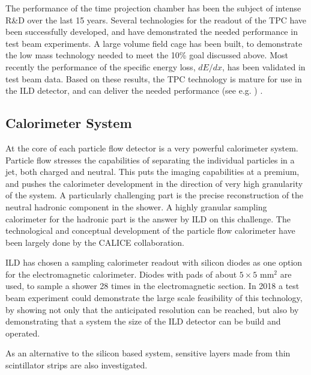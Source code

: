 \documentclass[%
 amsmath,amssymb,
 aps,
]{revtex4-1}
\begin{document}
The performance of the time projection chamber has been the subject of intense R\&D over the last 15 years. Several technologies for the readout of the TPC have been successfully developed, and have demonstrated the needed performance in test beam experiments. A large volume field cage has been built, to demonstrate the low mass technology needed to meet the 10\% goal discussed above. Most recently the performance of the specific energy loss, $dE/dx$, has been validated in test beam data. Based on these results, the TPC technology is mature for use in the ILD detector, and can deliver the needed performance (see e.g. \cite{Attie:2016yeu, Bouchez:2007pe}) . 


\subsection{Calorimeter System}
At the core of each particle flow detector is a very powerful calorimeter system. Particle flow stresses the capabilities of separating the individual particles in a jet, both charged and neutral. This puts the imaging capabilities at a premium, and pushes the calorimeter development in the direction of very high granularity of the system. A particularly challenging part is the precise reconstruction of the neutral hadronic component in the shower. A highly granular sampling calorimeter for the hadronic part is the answer by ILD on this challenge. The technological and conceptual development of the particle flow calorimeter have been largely done by the CALICE collaboration. 

ILD has chosen a sampling calorimeter readout with silicon diodes as one option for the electromagnetic calorimeter. Diodes with pads of about $5 \times 5$ mm$^2$ are used, to sample a shower 28 times in the electromagnetic section. In 2018 a test beam experiment could demonstrate the large scale feasibility of this technology, by showing not only that the anticipated resolution can be reached, but also by demonstrating that a system the size of the ILD detector can be build and operated. 

As an alternative to the silicon based system, sensitive layers made from thin scintillator strips are also investigated. 
\end{document}
